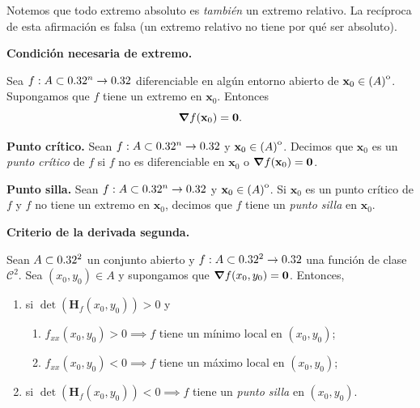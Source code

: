 \begin{obs}
 Notemos que todo extremo absoluto es \emph{tambi\'en} un extremo relativo. La rec\'iproca de esta afirmaci\'on es falsa (un extremo relativo no tiene por qu\'e ser absoluto).
\end{obs}

\begin{theorem}\textbf{Condici\'on necesaria de extremo.} \label{teo:grad_nulo}
 
 Sea $f: A \subset 0.32^n \to 0.32$ diferenciable en alg\'un entorno abierto de $\mathbf{x}_0 \in {\kern0pt(A)}^{\mathrm{o}}$. Supongamos que $f$ tiene un extremo en $\mathbf{x}_0$. Entonces
 \[
  \grad f(\mathbf{x}_0) = \mathbf{0}.
 \]
\end{theorem}

\begin{definition} \textbf{Punto cr\'itico.} \label{def:pto_crit}
 Sean $f: A \subset 0.32^n \to 0.32$ y $\mathbf{x}_0 \in {\kern0pt(A)}^{\mathrm{o}}$. Decimos que $\mathbf{x}_0$ es un \emph{punto cr\'itico} de $f$ si $f$ no es diferenciable en $\mathbf{x}_0$ o $\grad f{(\mathbf{x}_0)} = \mathbf{0}$.
\end{definition}

\begin{definition} \textbf{Punto silla.} \label{def:pto_silla}
 Sean $f: A \subset 0.32^n \to 0.32$ y $\mathbf{x}_0 \in {\kern0pt(A)}^{\mathrm{o}}$. Si $\mathbf{x}_0$ es un punto cr\'itico de $f$ y $f$ no tiene un extremo en $\mathbf{x}_0$, decimos que $f$ tiene un \emph{punto silla} en $\mathbf{x}_0$.
\end{definition}

\begin{theorem}\textbf{Criterio de la derivada segunda.} \label{teo:derivada_2da}

   Sean $A \subset 0.32^2$ un conjunto abierto y $f: A \subset 0.32^2 \to 0.32$ una funci\'on de clase $\mathcal{C}^2$. Sea $(x_0,y_0) \in A$ y supongamos que $\grad f(x_0,y_0) = \mathbf{0}$. Entonces,  
   \begin{enumerate} %
      \item si $\det(\boldsymbol{H}_f (x_0,y_0)) > 0$ y
      \begin{enumerate} %
          \item $f_{xx} (x_0,y_0) > 0\implies f$ tiene un m\'inimo local en $(x_0,y_0)$;
          \item $f_{xx} (x_0,y_0) < 0\implies f$ tiene un m\'aximo local en $(x_0,y_0)$;
      \end{enumerate}
      \item si $\det(\boldsymbol{H}_f (x_0,y_0)) < 0 \implies f$ tiene un \emph{punto silla} en $(x_0,y_0)$.
   \end{enumerate}  
\end{theorem}

